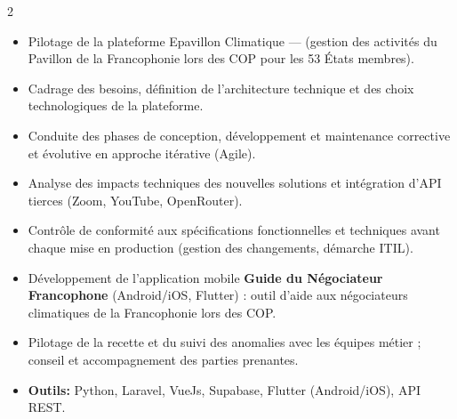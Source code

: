 \documentclass[10pt,a4paper,ragged2e,withhyper]{altacv}
\begin{document}
\begin{paracol}{2}
            \begin{itemize}
                \item Pilotage de la plateforme Epavillon Climatique —  (gestion des activités du Pavillon de la Francophonie lors des COP pour les 53 États membres).
                \item Cadrage des besoins, définition de l'architecture technique et des choix technologiques de la plateforme.
                \item Conduite des phases de conception, développement et maintenance corrective et évolutive en approche itérative (Agile).
                \item Analyse des impacts techniques des nouvelles solutions et intégration d'API tierces (Zoom, YouTube, OpenRouter).
                \item Contrôle de conformité aux spécifications fonctionnelles et techniques avant chaque mise en production (gestion des changements, démarche ITIL).
                \item Développement de l'application mobile \textbf{Guide du Négociateur Francophone} (Android/iOS, Flutter) : outil d'aide aux négociateurs climatiques de la Francophonie lors des COP.
                \item Pilotage de la recette et du suivi des anomalies avec les équipes métier ; conseil et accompagnement des parties prenantes.
                \item \textcolor{SecondaryColor}{\textbf{Outils: }} Python, Laravel, VueJs, Supabase, Flutter (Android/iOS), API REST.
            \end{itemize}
            \divider


\end{paracol}
\end{document}
